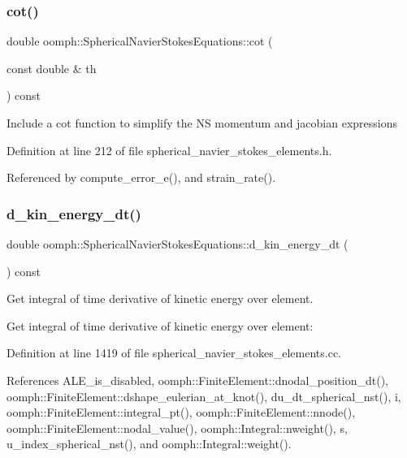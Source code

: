 \subsubsection{\texorpdfstring{cot()}{cot()}}
{\footnotesize\ttfamily double oomph\+::\+Spherical\+Navier\+Stokes\+Equations\+::cot (\begin{DoxyParamCaption}\item[{const double \&}]{th }\end{DoxyParamCaption}) const\hspace{0.3cm}{\ttfamily [inline]}}

Include a cot function to simplify the NS momentum and jacobian expressions 

Definition at line 212 of file spherical\+\_\+navier\+\_\+stokes\+\_\+elements.\+h.



Referenced by compute\+\_\+error\+\_\+e(), and strain\+\_\+rate().

\mbox{\label{classoomph_1_1SphericalNavierStokesEquations_a0c6aba8fc927c3e40e9abb362dc8797f}} 
\subsubsection{\texorpdfstring{d\+\_\+kin\+\_\+energy\+\_\+dt()}{d\_kin\_energy\_dt()}}
{\footnotesize\ttfamily double oomph\+::\+Spherical\+Navier\+Stokes\+Equations\+::d\+\_\+kin\+\_\+energy\+\_\+dt (\begin{DoxyParamCaption}{ }\end{DoxyParamCaption}) const}



Get integral of time derivative of kinetic energy over element. 

Get integral of time derivative of kinetic energy over element\+: 

Definition at line 1419 of file spherical\+\_\+navier\+\_\+stokes\+\_\+elements.\+cc.



References A\+L\+E\+\_\+is\+\_\+disabled, oomph\+::\+Finite\+Element\+::dnodal\+\_\+position\+\_\+dt(), oomph\+::\+Finite\+Element\+::dshape\+\_\+eulerian\+\_\+at\+\_\+knot(), du\+\_\+dt\+\_\+spherical\+\_\+nst(), i, oomph\+::\+Finite\+Element\+::integral\+\_\+pt(), oomph\+::\+Finite\+Element\+::nnode(), oomph\+::\+Finite\+Element\+::nodal\+\_\+value(), oomph\+::\+Integral\+::nweight(), s, u\+\_\+index\+\_\+spherical\+\_\+nst(), and oomph\+::\+Integral\+::weight().




